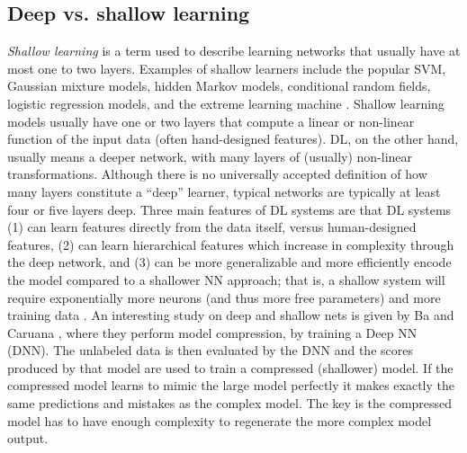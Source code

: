 \documentclass[12pt]{spieman}
\begin{document}
\begin{spacing}{1}
\subsection{Deep vs. shallow learning}

\textit{Shallow learning} is a term used to describe learning networks that usually have at most one to two layers. Examples of shallow learners include the popular SVM, Gaussian mixture models, hidden Markov models, conditional random fields, logistic regression models, and the extreme learning machine \cite{Deng2014} . Shallow learning models usually have one or two layers that compute a linear or non-linear function of the input data (often hand-designed features). DL, on the other hand, usually means a deeper network, with many layers of (usually) non-linear transformations. Although there is no universally accepted definition of how many layers constitute a ``deep'' learner, typical networks are typically at least four or five layers deep. Three main features of DL systems are that DL systems (1) can learn features directly from the data itself, versus human-designed features, (2) can learn hierarchical features which increase in complexity through the deep network, and (3) can be more generalizable and more efficiently encode the model compared to a shallower NN approach; that is, a shallow system will require exponentially more neurons (and thus more free parameters) and more training data \cite{wang2015survey, Wan2014Deep} . An interesting study on deep and shallow nets is given by Ba and Caruana \cite{ba2014deep} , where they perform model compression, by training a Deep NN (DNN). The unlabeled data is then evaluated by the DNN and the scores produced by that model are used to train a compressed (shallower) model. If the compressed model learns to mimic the large model perfectly it makes exactly the same predictions and mistakes as the complex model. The key is the compressed model has to have enough complexity to regenerate the more complex model output.


\end{spacing}
\end{document}
